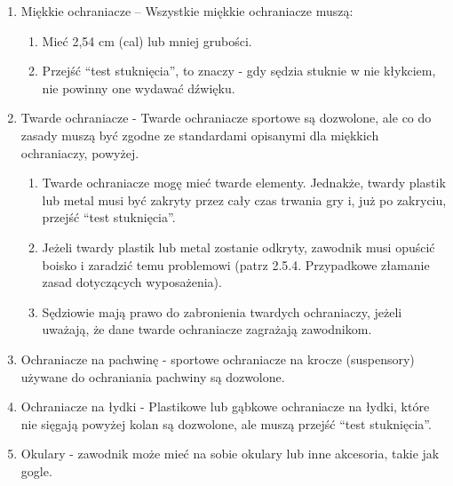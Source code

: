 \documentclass[12pt]{article}
\begin{document}
\begin{enumerate}
	\item
	      Miękkie ochraniacze -- Wszystkie miękkie ochraniacze muszą:

	      \begin{enumerate}
		      \item
		            Mieć 2,54 cm (cal) lub mniej grubości.
		      \item
		            Przejść ``test stuknięcia'', to znaczy - gdy sędzia stuknie w nie
		            kłykciem, nie powinny one wydawać dźwięku.
	      \end{enumerate}
	\item
	      Twarde ochraniacze - Twarde ochraniacze sportowe są
	      dozwolone, ale co do zasady muszą być zgodne ze standardami opisanymi
	      dla miękkich ochraniaczy, powyżej.

	      \begin{enumerate}
		      \item
		            Twarde ochraniacze mogę mieć twarde elementy. Jednakże, twardy
		            plastik lub metal musi być zakryty przez cały czas trwania gry i,
		            już po zakryciu, przejść ``test stuknięcia''.
		      \item
		            Jeżeli twardy plastik lub metal zostanie odkryty, zawodnik musi
		            opuścić boisko i zaradzić temu problemowi (patrz 2.5.4. Przypadkowe
		            złamanie zasad dotyczących wyposażenia).
		      \item
		            Sędziowie mają prawo do zabronienia twardych ochraniaczy, jeżeli
		            uważają, że dane twarde ochraniacze zagrażają zawodnikom.
	      \end{enumerate}
	\item
	      Ochraniacze na pachwinę - sportowe ochraniacze na krocze
	      (suspensory) używane do ochraniania pachwiny są dozwolone.
	\item
	      Ochraniacze na łydki - Plastikowe lub gąbkowe ochraniacze na
	      łydki, które nie sięgają powyżej kolan są dozwolone, ale muszą przejść
	      ``test stuknięcia''.
	\item
	      Okulary - zawodnik może mieć na sobie okulary lub inne
	      akcesoria, takie jak gogle.


\end{enumerate}
\end{document}
